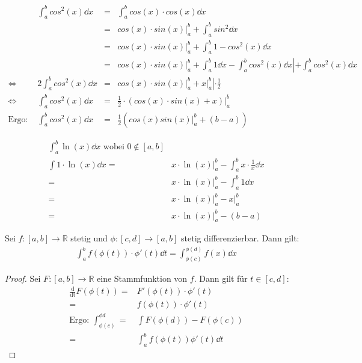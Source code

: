 \begin{Beispiel}{
	\begin{align*}
		& \int_a^b cos^2(x) \dd{x} & = &  \int_a^b cos(x) \cdot cos(x) \dd{x} \\
		& &  = & \left. cos(x) \cdot sin(x) \right\vert_a^b + 
			\int_a^b sin^2 \dd{x} \\
		& & = & \left. cos(x) \cdot sin(x) \right\vert_a^b + 
			\int_a^b 1 - cos^2(x) \dd{x} \\
		& & = & \left. cos(x) \cdot sin(x) \right\vert_a^b 
			+ \int_a^b 1 \dd{x} - \int_a^b cos^2(x) \dd{x} 
			 \left\vert + \int_a^b cos^2(x) \dd{x} \right. \\
	 \Leftrightarrow 
	 & 2 \int_a^b cos^2(x) \dd{x} & = & \left. cos(x) \cdot sin(x) \right\vert_a^b 
	 	+ \left. x \right\vert_a^b  \left\vert \cdot \frac{1}{2} \right. \\
	 \Leftrightarrow
	& \int_a^b cos^2(x) \dd{x} & = & \frac{1}{2} \cdot 
		\left. \left( cos(x) \cdot sin(x) + x\right) \right\vert_a^b \\
	\text{Ergo: } & \int_a^b cos^2(x) \dd{x} & = & \frac{1}{2} (cos(x) sin(x) 
		\vert_a^b + (b-a))
	\end{align*}
	
	\begin{align*}
		\int_a^b \ln (x) \dd{x} \text{ wobei } 0 \not\in [a,b] \\
		\int 1 \cdot \ln (x) \dd{x} = & x \cdot \ln (x)\vert_a^b - 
		\int_a^b x \cdot \frac{1}{x} \dd{x} \\
		= & \left. x \cdot \ln (x) \right\vert_a^b - \int_a^b 1 \dd{x} \\
		= & \left. x \cdot \ln (x)\right\vert_a^b - \left. x\right\vert_a^b \\
		= & \left. x \cdot \ln (x)\right\vert_a^b - (b - a)
	\end{align*}
}\end{Beispiel}

\begin{Satz}{\label{vl_12_satz_04}
	Sei $f: [a,b] \rightarrow \mathbb{R}$ stetig und $\phi: [c,d] \rightarrow [a,b]$ 
	stetig differenzierbar. Dann gilt:
	\begin{align*}
		\int_a^b f(\phi(t))\cdot\phi'(t)\dd{t} = \int_{\phi(c)}^{\phi(d)} 
		f(x) \dd{x}
	\end{align*}	 
}\end{Satz}


\begin{proof}
	Sei $F : [a,b] \rightarrow \mathbb{R}$ eine Stammfunktion von $f$. Dann gilt für 
	$t \in [c,d]$:
	\begin{align*}
		\frac{\mathrm{d}}{\mathrm{dt}}F(\phi(t)) = &  F'(\phi(t)) \cdot \phi'(t) \\
		= & f(\phi(t))\cdot \phi'(t) \\
		\text{Ergo: } \int_{\phi(c)}^{\phi{d}} = & \int F(\phi(d))-F(\phi(c)) \\
		= & \int_a^b f(\phi(t)) \phi'(t) \dd{t}
	\end{align*}
\end{proof}

